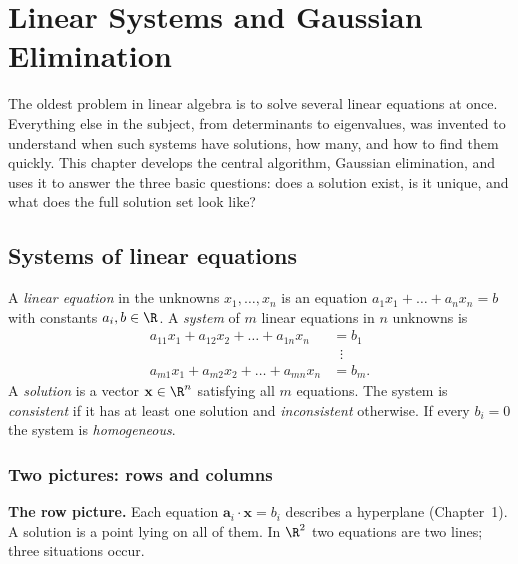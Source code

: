\chapter{Linear Systems and Gaussian Elimination}

The oldest problem in linear algebra is to solve several linear equations at once. Everything else in the subject, from determinants to eigenvalues, was invented to understand when such systems have solutions, how many, and how to find them quickly. This chapter develops the central algorithm, Gaussian elimination, and uses it to answer the three basic questions: does a solution exist, is it unique, and what does the full solution set look like?

\section{Systems of linear equations}

\begin{definition}
A \emph{linear equation} in the unknowns $x_1,\dots,x_n$ is an equation $a_1x_1+\dots+a_nx_n=b$ with constants $a_i,b\in\R$. A \emph{system} of $m$ linear equations in $n$ unknowns is
\[
\begin{aligned}
a_{11}x_1+a_{12}x_2+\dots+a_{1n}x_n&=b_1\\
&\;\;\vdots\\
a_{m1}x_1+a_{m2}x_2+\dots+a_{mn}x_n&=b_m.
\end{aligned}
\]
A \emph{solution} is a vector $\mathbf{x}\in\R^n$ satisfying all $m$ equations. The system is \emph{consistent} if it has at least one solution and \emph{inconsistent} otherwise. If every $b_i=0$ the system is \emph{homogeneous}.
\end{definition}

\subsection*{Two pictures: rows and columns}

\textbf{The row picture.} Each equation $\mathbf{a}_i\cdot\mathbf{x}=b_i$ describes a hyperplane (Chapter~1). A solution is a point lying on all of them. In $\R^2$ two equations are two lines; three situations occur.

